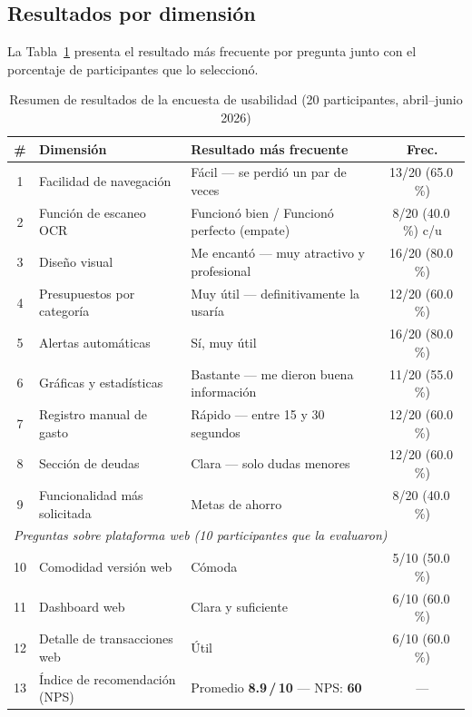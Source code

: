 \subsection{Resultados por dimensión}

La Tabla~\ref{tab:encuesta-resumen} presenta el resultado más frecuente por pregunta junto con el porcentaje de participantes que lo seleccionó.

\begin{table}[H]
  \centering
  \small
  \caption{Resumen de resultados de la encuesta de usabilidad (20 participantes, abril--junio 2026)}
  \label{tab:encuesta-resumen}
  \begin{tabular}{c p{3.8cm} p{5.5cm} c}
    \toprule
    \textbf{\#} & \textbf{Dimensión} & \textbf{Resultado más frecuente} & \textbf{Frec.} \\
    \midrule
    1 & Facilidad de navegación       & Fácil --- se perdió un par de veces              & 13/20 (65.0\,\%) \\[4pt]
    2 & Función de escaneo OCR        & Funcionó bien / Funcionó perfecto (empate)       & 8/20 (40.0\,\%) c/u \\[4pt]
    3 & Diseño visual                 & Me encantó --- muy atractivo y profesional       & 16/20 (80.0\,\%) \\[4pt]
    4 & Presupuestos por categoría    & Muy útil --- definitivamente la usaría           & 12/20 (60.0\,\%) \\[4pt]
    5 & Alertas automáticas           & Sí, muy útil                                     & 16/20 (80.0\,\%) \\[4pt]
    6 & Gráficas y estadísticas       & Bastante --- me dieron buena información         & 11/20 (55.0\,\%) \\[4pt]
    7 & Registro manual de gasto      & Rápido --- entre 15 y 30 segundos                & 12/20 (60.0\,\%) \\[4pt]
    8 & Sección de deudas             & Clara --- solo dudas menores                     & 12/20 (60.0\,\%) \\[4pt]
    9 & Funcionalidad más solicitada  & Metas de ahorro                                  & 8/20 (40.0\,\%) \\[4pt]
    \midrule
    \multicolumn{4}{l}{\textit{Preguntas sobre plataforma web (10 participantes que la evaluaron)}} \\[4pt]
    10 & Comodidad versión web        & Cómoda                                           & 5/10 (50.0\,\%) \\[4pt]
    11 & Dashboard web                & Clara y suficiente                               & 6/10 (60.0\,\%) \\[4pt]
    12 & Detalle de transacciones web & Útil                                             & 6/10 (60.0\,\%) \\[4pt]
    \midrule
    13 & Índice de recomendación (NPS) & Promedio \textbf{8.9\,/\,10} --- NPS: \textbf{60} & --- \\
    \bottomrule
  \end{tabular}
\end{table}

